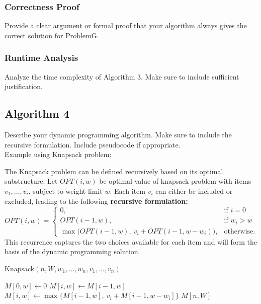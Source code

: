 \documentclass{article}
\begin{document}
\subsubsection{Correctness Proof}
{\color{red} Provide a clear argument or formal proof that your algorithm always gives the correct solution for ProblemG.}

\subsubsection{Runtime Analysis}
{\color{red} Analyze the time complexity of Algorithm 3. Make sure to include sufficient
justification.}
\subsection{Algorithm 4}
{\color{red} Describe your dynamic programming algorithm. Make sure to include the recursive formulation. Include pseudocode if appropriate.\\

Example using Knapsack problem:\\  
}

\noindent The Knapsack problem can be defined recursively based on its optimal substructure.  
Let $OPT(i,w)$ be optimal value of knapsack problem with items $v_1, \dots, v_i$, subject to weight limit $w$.   
Each item $v_i$ can either be included or excluded, leading to the following \textbf{recursive formulation:}
\[
OPT(i, w) =
\begin{cases}
0, & \text{if } i = 0 \\
OPT(i - 1, w), & \text{if } w_i > w \\
\max\big(OPT(i - 1, w),\ v_i + OPT(i - 1, w - w_i)\big), & \text{otherwise.}
\end{cases}
\]
This recurrence captures the two choices available for each item and will form the basis of the dynamic programming solution.

\setcounter{algorithm}{3}
\begin{algorithm}[H]
\caption{Knapsack$(n, W, w_1, \ldots, w_n, v_1, \ldots, v_n)$}
\begin{algorithmic}[1]
    \State $M[0, w] \gets 0$
\EndFor
{}
            \State $M[i, w] \gets M[i - 1, w]$
        \Else
            \State $M[i, w] \gets \max\{M[i - 1, w],\ v_i + M[i - 1, w - w_i]\}$
        \EndIf
    \EndFor
\EndFor
\State \Return $M[n, W]$
\end{algorithmic}
\end{algorithm}
\end{document}
